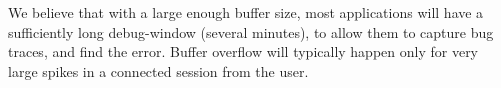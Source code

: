 We believe that with a large enough buffer size, most applications will have a sufficiently long debug-window (several minutes), to allow them to capture bug traces, and find the error.
Buffer overflow will typically happen only for very large spikes in a connected session from the user.


